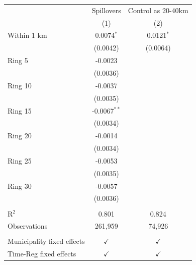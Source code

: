 \begingroup
\centering
\begin{tabular}{lcc}
   \toprule
                                 & Spillovers     & Control as 20-40km \\   
                                 & (1)            & (2)\\  
   \midrule 
   Within 1 km                   & 0.0074$^{*}$   & 0.0121$^{*}$\\   
                                 & (0.0042)       & (0.0064)\\   
   Ring 5                        & -0.0023        &   \\   
                                 & (0.0036)       &   \\   
   Ring 10                       & -0.0037        &   \\   
                                 & (0.0035)       &   \\   
   Ring 15                       & -0.0067$^{**}$ &   \\   
                                 & (0.0034)       &   \\   
   Ring 20                       & -0.0014        &   \\   
                                 & (0.0034)       &   \\   
   Ring 25                       & -0.0053        &   \\   
                                 & (0.0035)       &   \\   
   Ring 30                       & -0.0057        &   \\   
                                 & (0.0036)       &   \\   
    \\
   R$^2$                         & 0.801          & 0.824\\  
   Observations                  & 261,959        & 74,926\\  
    \\
   Municipality fixed effects & $\checkmark$   & $\checkmark$\\   
   Time-Reg fixed effects     & $\checkmark$   & $\checkmark$\\   
   \bottomrule
\end{tabular}
\par\endgroup
